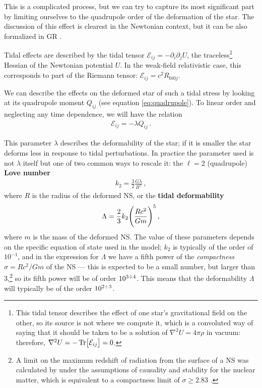 \documentclass[main.tex]{subfiles}
\begin{document}
This is a complicated process, but we can try to capture its most significant part by limiting ourselves to the quadrupole order of the deformation of the star. 
The discussion of this effect is clearest in the Newtonian context, but it can be also formalized in \ac{GR} \cite[section 14.4.1]{maggioreGravitationalWavesVolume2018}.

Tidal effects are described by the tidal tensor \(\mathcal{E}_{ij} = - \partial_{i} \partial_{j} U\), the traceless\footnote{This tidal tensor describes the effect of one star's gravitational field on the other, so its source is not where we compute it, which is a convoluted way of saying that it should be taken to be a solution of \(\nabla^2 U = 4 \pi \rho \) in vacuum: therefore, \(\nabla^2 U = - \Tr[\mathcal{E}_{ij}] = 0\).} Hessian of the Newtonian potential \(U\). In the weak-field relativistic case, this corresponds to part of the Riemann tensor: \(\mathcal{E}_{ij} = c^2R_{0i0j}\). 

We can describe the effects on the deformed star of such a tidal stress by looking at its quadrupole moment \(Q_{ij}\) (see equation \eqref{eq:quadrupole}).
To linear order and neglecting any time dependence, we will have the relation 
%
\begin{align}
\mathcal{E}_{ij} = - \lambda Q_{ij}
\,.
\end{align}


This parameter \(\lambda \) describes the deformability of the star; if it is smaller the star deforms less in response to tidal perturbations. 
In practice the parameter used is not \(\lambda \) itself but one of two common ways to rescale it: the \(\ell=2\) (quadrupole) \textbf{Love number} 
%
\begin{align}
k_2 = \frac{3}{2} \frac{G \lambda }{R^{5}}
\,,
\end{align}
%
where \(R\) is the radius of the deformed \ac{NS}, or the \textbf{tidal deformability} 
%
\begin{align}
\Lambda = \frac{2}{3} k_2 \qty(\frac{Rc^2}{Gm})^{5} 
\,,
\end{align}
%
where \(m\) is the mass of the deformed \ac{NS}. 
The value of these parameters depends on the specific equation of state used in the model; \(k_2\) is typically of the order of \(10^{-1}\), and in the expression for \(\Lambda \) we have a fifth power of the \emph{compactness} \(\sigma = R c^2 / Gm\) of the \ac{NS} --- this is expected to be a small number, but larger than 3,\footnote{A limit on the maximum redshift of radiation from the surface of a \ac{NS} was calculated by \textcite{lindblomLimitsGravitationalRedshift1984} under the assumptions of causality and stability for the nuclear matter, which is equivalent to a compactness limit of \(\sigma \geq 2.83\) \cite{lattimerNeutronStarObservations2007}. } so its fifth power will be of order \(10^{3 \divisionsymbol 4}\). This means that the deformability \(\Lambda \) will typically be of the order \(10^{2 \divisionsymbol 3}\). 
\end{document}

